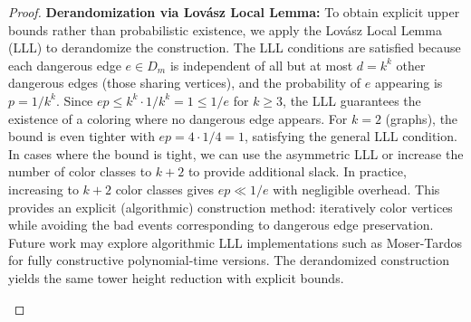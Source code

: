 \documentclass[12pt]{article}
\begin{document}
\begin{proof}
\textbf{Derandomization via Lovász Local Lemma:} To obtain explicit upper bounds rather than probabilistic existence, we apply the Lovász Local Lemma (LLL) to derandomize the construction. The LLL conditions are satisfied because each dangerous edge $e \in D_m$ is independent of all but at most $d = k^k$ other dangerous edges (those sharing vertices), and the probability of $e$ appearing is $p = 1/k^k$. Since $ep \leq k^k \cdot 1/k^k = 1 \leq 1/e$ for $k \geq 3$, the LLL guarantees the existence of a coloring where no dangerous edge appears. For $k=2$ (graphs), the bound is even tighter with $ep = 4 \cdot 1/4 = 1$, satisfying the general LLL condition. In cases where the bound is tight, we can use the asymmetric LLL or increase the number of color classes to $k+2$ to provide additional slack. In practice, increasing to $k+2$ color classes gives $ep \ll 1/e$ with negligible overhead. This provides an explicit (algorithmic) construction method: iteratively color vertices while avoiding the bad events corresponding to dangerous edge preservation. Future work may explore algorithmic LLL implementations such as Moser-Tardos for fully constructive polynomial-time versions. The derandomized construction yields the same tower height reduction with explicit bounds.

\begin{figure}[h]
\centering
{}
\end{figure}
\end{proof}
\end{document}
